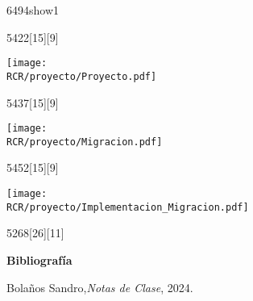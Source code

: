 \begin{NuevaPagina}{64}{94}{show1}
	\begin{NuevoParrafo}{54}{22}[15][9]
		\begin{Marco}[\LineaSupC][\LineaInfC][\LineaIzqC][\LineaDerC][CBlanco]
			\subseccionC{\PVPry}%
			\centering\texttt{[image: \\RCR/proyecto/Proyecto.pdf]}
		\end{Marco}
	\end{NuevoParrafo}
	\begin{NuevoParrafo}{54}{37}[15][9]
		\begin{Marco}[\LineaSupC][\LineaInfC][\LineaIzqC][\LineaDerC][CBlanco]
			\subseccionC{\PVMig}%
			\centering\texttt{[image: \\RCR/proyecto/Migracion.pdf]}
		\end{Marco}
	\end{NuevoParrafo}
	\begin{NuevoParrafo}{54}{52}[15][9]
		\begin{Marco}[\LineaSupC][\LineaInfC][\LineaIzqC][\LineaDerC][CBlanco]
			\subseccionC{\PVImM}%
			\centering\texttt{[image: \\RCR/proyecto/Implementacion\_Migracion.pdf]}
		\end{Marco}
	\end{NuevoParrafo}
	\begin{NuevoParrafo}{52}{68}[26][11]
		\begin{Marco}[\LineaSupC][\LineaInfC][\LineaIzqC][\LineaDerC][CBlanco]	
		 {\Large\centering \textbf{Bibliografía}}	
		 \vspace{-30pt} 
		 \renewcommand{\bibfont}{\normalfont\small}
		 \printbibliography[title={Libros/Artículos}]
		 \let\oldthebibliography=\thebibliography
		 \let\oldendthebibliography=\endthebibliography
		 \renewenvironment{thebibliography}[1]{
		 	\oldthebibliography{#1}
		 	\setcounter{enumiv}{1} %
		 }{\oldendthebibliography}
		 \begin{thebibliography}{9}		 	
		 	Bolaños Sandro,\textit{Notas de Clase}, 2024.
		 \end{thebibliography}		
		\end{Marco}
	\end{NuevoParrafo}
	
\end{NuevaPagina}